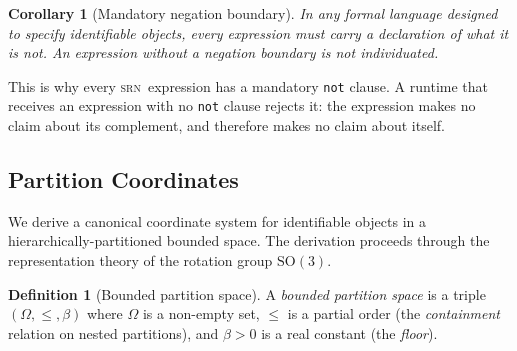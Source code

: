 \documentclass[twocolumn,11pt,a4paper]{article}
\newtheorem{corollary}[theorem]{Corollary}
\theoremstyle{definition}
\newtheorem{definition}[theorem]{Definition}
\theoremstyle{remark}
\newcommand{\srn}{\textsc{srn}}
\begin{document}
\begin{corollary}[Mandatory negation boundary]
\label{cor:boundary}
In any formal language designed to specify identifiable objects, every
expression must carry a declaration of what it is \emph{not}.  An
expression without a negation boundary is not individuated.
\end{corollary}

This is why every \srn\ expression has a mandatory \lstinline|not|
clause.  A runtime that receives an expression with no
\lstinline|not| clause rejects it: the expression makes no claim about
its complement, and therefore makes no claim about itself.

\subsection{Partition Coordinates}
\label{sec:partcoord}

We derive a canonical coordinate system for identifiable objects in a
hierarchically-partitioned bounded space.  The derivation proceeds
through the representation theory of the rotation group $\mathrm{SO}(3)$.

\begin{definition}[Bounded partition space]
A \emph{bounded partition space} is a triple $(\Omega, \leq, \beta)$
where $\Omega$ is a non-empty set, $\leq$ is a partial order (the
\emph{containment} relation on nested partitions), and $\beta > 0$
is a real constant (the \emph{floor}).
\end{definition}
\end{document}
